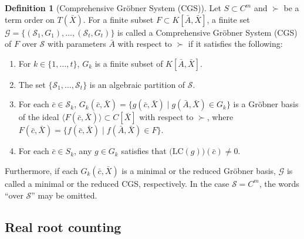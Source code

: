 \documentclass{birkjour}
\theoremstyle{plain}
\theoremstyle{definition}
\newtheorem{definition}[theorem]{Definition}
\newcommand{\Abar}{\bar{A}}
\newcommand{\cbar}[0]{\bar{c}}
\newcommand{\Xbar}{\bar{X}}
\newcommand{\lc}{\mathrm{LC}}
\newcommand{\ideal}[1]{{\langle{#1}\rangle}}
\begin{document}
    \begin{definition}[Comprehensive Gr\"obner System (CGS)]
        \label{def:CGS}
        Let $S\subset C^m$ and $\succ$ be a term order on $T(\Xbar)$. 
        For a finite subset $F\subset K[\Abar,\Xbar]$, a finite set
        $\mathcal{G}=\{(\mathcal{S}_1,G_1),\dots,(\mathcal{S}_t,G_t)\}$ is 
        called a Comprehensive Gr\"obner System (CGS) of $F$ over $\mathcal{S}$
        with parameters $\Abar$ with respect to $\succ$ if it satisfies
        the following:
        \begin{enumerate}
            \item For $k\in\{1,\dots,t\}$, $G_k$ is a finite subset of $K[\Abar,\Xbar]$.
            \item The set $\{\mathcal{S}_1,\dots,\mathcal{S}_t\}$ is an algebraic partition of 
            $\mathcal{S}$.
            \item For each $\cbar\in\mathcal{S}_k$, 
            $G_k(\bar{c},\bar{X})=\{g(\bar{c},\bar{X})\mid g(\Abar,\bar{X})\in G_k\}$
            is a Gr\"obner basis of the ideal 
            $\ideal{F(\bar{c},\bar{X})}\subset C[\bar{X}]$ with respect to $\succ$, where
            $F(\bar{c},\bar{X})=\{f(\bar{c},\bar{X})\mid f(\Abar,\bar{X}) \in F\}$.
            \item For each $\bar{c}\in S_k$, any $g\in G_k$ satisfies that 
            $\big(\lc(g)\big)(\bar{c})\neq 0$.
        \end{enumerate}
        Furthermore, if each $G_k(\bar{c},\bar{X})$ is a minimal or the reduced Gr\"obner basis,
        $\mathcal{G}$ is called a minimal or the reduced CGS, respectively. 
        In the case $\mathcal{S}=C^m$, the words ``over $\mathcal{S}$'' may be omitted.
    \end{definition}

    \subsection{Real root counting}
    \label{sec:real-root-counting}
    
\end{document}
